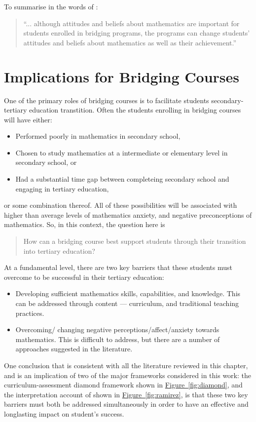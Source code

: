 \documentclass[twoside,12pt,a4paper]{report}
\newcommand{\reffig}[1]{\hyperref[fig:#1]{Figure~\ref{fig:#1}}}
\begin{document}
To summarise in the words of :
\begin{quote}
``... although attitudes and beliefs about mathematics are important for students
enrolled in bridging programs, the programs can change students' attitudes and
beliefs about mathematics as well as their achievement.''
\end{quote}












\section{Implications for Bridging Courses}

One of the primary roles of bridging courses is to facilitate students secondary-tertiary education transtition. Often the students enrolling in bridging courses will have either:\begin{itemize}
	\item Performed poorly in mathematics in secondary school, 
	\item Chosen to study mathematics at a intermediate or elementary level in secondary school, or
	\item Had a substantial time gap between completeing secondary school and engaging in tertiary education,
\end{itemize}
or some combination thereof. All of these possibilities will be associated with higher than average levels of mathematics anxiety, and negative preconceptions of mathematics. So, in this context, the question here is

\begin{quote}
How can a bridging course best support students through their transition into tertiary education?
\end{quote}

At a fundamental level, there are two key barriers that these students must overcome to be successful in their tertiary education:
\begin{itemize}
	\item Developing sufficient mathematics skills, capabilities, and knowledge. This can be addressed through content --- curriculum, and traditional teaching practices. 
	\item Overcoming/ changing negative perceptions/affect/anxiety towards mathematics. This is difficult to address, but there are a number of approaches suggested in the literature. 
\end{itemize}
One conclusion that is consistent with all the literature reviewed in this chapter, and is an implication of two of the major frameworks considered in this work: the curriculum-assessment diamond framework shown in \reffig{diamond}, and the interpretation account of shown in \reffig{ramirez}, is that these two key barriers must both be addressed simultaneously in order to have an effective and longlasting impact on student's success. 
\end{document}
